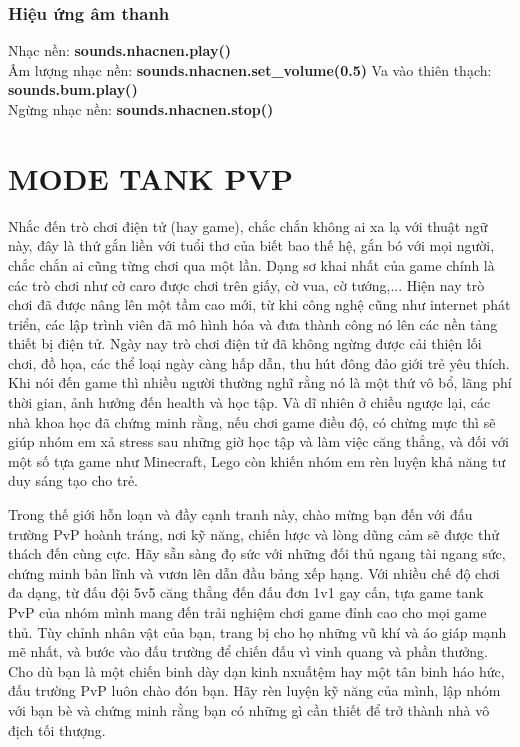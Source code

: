 \documentclass[a4paper]{article}
\begin{document}
\subsubsection{Hiệu ứng âm thanh}
Nhạc nền: \textbf{sounds.nhacnen.play()}\\
Âm lượng nhạc nền: \textbf{sounds.nhacnen.set\_volume(0.5)} Va vào thiên
thạch: \textbf{sounds.bum.play()}\\
Ngừng nhạc nền: \textbf{sounds.nhacnen.stop()}
\newpage
\section{MODE TANK PVP}
Nhắc đến trò chơi điện tử (hay game), chắc chắn không ai xa lạ với thuật
ngữ này, đây là thứ gắn liền với tuổi thơ của biết bao thế hệ, gắn bó
với mọi người, chắc chắn ai cũng từng chơi qua một lần. Dạng sơ khai
nhất của game chính là các trò chơi như cờ caro được chơi trên giấy, cờ
vua, cờ tướng,... Hiện nay trò chơi đã được nâng lên một tầm cao mới, từ
khi công nghệ cũng như internet phát triển, các lập trình viên đã mô
hình hóa và đưa thành công nó lên các nền tảng thiết bị điện tử. Ngày
nay trò chơi điện tử đã không ngừng được cải thiện lối chơi, đồ họa, các
thể loại ngày càng hấp dẫn, thu hút đông đảo giới trẻ yêu thích. Khi nói
đến game thì nhiều người thường nghĩ rằng nó là một thứ vô bổ, lãng phí
thời gian, ảnh hưởng đến health và học tập. Và dĩ nhiên ở chiều ngược
lại, các nhà khoa học đã chứng minh rằng, nếu chơi game điều độ, có
chừng mực thì sẽ giúp nhóm em xả stress sau những giờ học tập và làm
việc căng thẳng, và đối với một số tựa game như Minecraft, Lego còn
khiến nhóm em rèn luyện khả năng tư duy sáng tạo cho trẻ.

Trong thế giới hỗn loạn và đầy cạnh tranh này, chào mừng bạn đến với đấu
trường PvP hoành tráng, nơi kỹ năng, chiến lược và lòng dũng cảm sẽ được
thử thách đến cùng cực. Hãy sẵn sàng đọ sức với những đối thủ ngang tài
ngang sức, chứng minh bản lĩnh và vươn lên dẫn đầu bảng xếp hạng. Với
nhiều chế độ chơi đa dạng, từ đấu đội 5v5 căng thẳng đến đấu đơn 1v1 gay cấn, tựa game tank PvP của nhóm mình mang đến trải nghiệm chơi game đỉnh cao cho mọi game thủ. Tùy chỉnh nhân vật của bạn, trang bị cho họ những vũ khí và áo giáp mạnh mẽ nhất, và bước vào đấu trường để chiến đấu vì vinh quang và phần thưởng. Cho dù bạn là một chiến binh dày dạn kinh nxuấtệm hay một tân binh háo hức, đấu trường PvP luôn chào đón bạn. Hãy rèn luyện kỹ năng của mình, lập nhóm với bạn bè và chứng minh rằng bạn có những gì cần thiết để trở thành nhà vô địch tối thượng.
\end{document}
